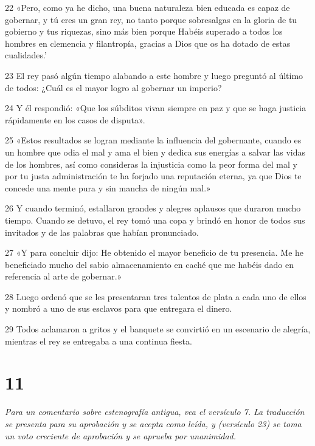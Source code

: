\par 22 «Pero, como ya he dicho, una buena naturaleza bien educada es capaz de gobernar, y tú eres un gran rey, no tanto porque sobresalgas en la gloria de tu gobierno y tus riquezas, sino más bien porque Habéis superado a todos los hombres en clemencia y filantropía, gracias a Dios que os ha dotado de estas cualidades.'

\par 23 El rey pasó algún tiempo alabando a este hombre y luego preguntó al último de todos: ¿Cuál es el mayor logro al gobernar un imperio?

\par 24 Y él respondió: «Que los súbditos vivan siempre en paz y que se haga justicia rápidamente en los casos de disputa».

\par 25 «Estos resultados se logran mediante la influencia del gobernante, cuando es un hombre que odia el mal y ama el bien y dedica sus energías a salvar las vidas de los hombres, así como consideras la injusticia como la peor forma del mal y por tu justa administración te ha forjado una reputación eterna, ya que Dios te concede una mente pura y sin mancha de ningún mal.»

\par 26 Y cuando terminó, estallaron grandes y alegres aplausos que duraron mucho tiempo. Cuando se detuvo, el rey tomó una copa y brindó en honor de todos sus invitados y de las palabras que habían pronunciado.

\par 27 «Y para concluir dijo: He obtenido el mayor beneficio de tu presencia. Me he beneficiado mucho del sabio almacenamiento en caché que me habéis dado en referencia al arte de gobernar.»

\par 28 Luego ordenó que se les presentaran tres talentos de plata a cada uno de ellos y nombró a uno de sus esclavos para que entregara el dinero.

\par 29 Todos aclamaron a gritos y el banquete se convirtió en un escenario de alegría, mientras el rey se entregaba a una continua fiesta.

\chapter{11}

\par \textit{Para un comentario sobre estenografía antigua, vea el versículo 7. La traducción se presenta para su aprobación y se acepta como leída, y (versículo 23) se toma un voto creciente de aprobación y se aprueba por unanimidad.}

